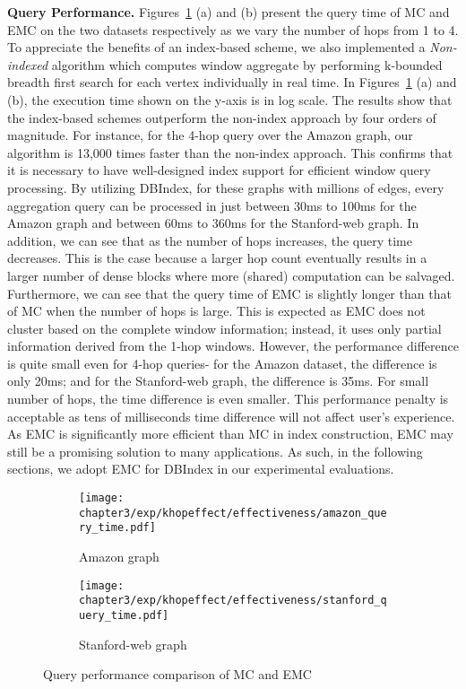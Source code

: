 \textbf{Query Performance.}       
Figures~\ref{fig:khop_effective_query_time} (a) and (b)
present the query time of MC and EMC 
on the two datasets respectively 
as we vary the number of hops from 1 to 4.
To appreciate the benefits of an index-based scheme, we also implemented
a \emph{Non-indexed} algorithm which computes window aggregate by performing k-bounded breadth
first search for each vertex individually in real time.
In Figures~\ref{fig:khop_effective_query_time} (a) and (b),
the execution time shown on the y-axis is in log scale. The results show that the index-based 
schemes outperform the non-index approach by four orders of magnitude. 
For instance, for the 4-hop query over the Amazon graph, 
our algorithm is 13,000 times faster than the non-index approach. 
This confirms that it is necessary to have well-designed index support 
for efficient window query processing. By utilizing DBIndex, 
for these graphs with millions of edges, every aggregation query 
can be processed in just between 30ms to 100ms for the Amazon graph and 
between 60ms to 360ms for the Stanford-web graph. In addition, we can 
see that as the number of hops increases, the query time decreases. 
This is the case because a larger hop count eventually results in a larger
number of dense blocks where more (shared) computation can be salvaged. 
Furthermore, we can see that the query time of EMC is slightly longer 
than that of MC when the number of hops is large. This is expected as 
EMC does not cluster based on the complete window information; instead, it
uses only partial information derived from the 1-hop windows. 
However, the performance difference is quite small even for 4-hop queries- for
the Amazon dataset, the difference is only 20ms; and for the Stanford-web
graph, the difference is 35ms. 
For small number of hops, the time difference is even smaller. 
This performance penalty is acceptable as tens of milliseconds time 
difference will not affect user's experience.  As EMC is significantly more 
efficient than MC in index construction, EMC may still be a 
promising solution to many applications. As such, 
in the following sections, we adopt EMC for DBIndex in
our experimental evaluations.  
 
\begin{figure}[h]
\centering
\begin{subfigure}{0.48\linewidth}
\centering
  \texttt{[image: chapter3/exp/khopeffect/effectiveness/amazon\_query\_time.pdf]}
  \caption{Amazon graph}
\end{subfigure}%
\begin{subfigure}{0.48\linewidth}
\centering
  \texttt{[image: chapter3/exp/khopeffect/effectiveness/stanford\_query\_time.pdf]}
  \caption{Stanford-web graph}
\end{subfigure}
\caption{Query performance comparison of MC and EMC}
\label{fig:khop_effective_query_time}
\end{figure}

